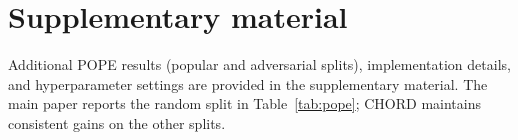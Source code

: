 \section{Supplementary material}

Additional POPE results (popular and adversarial splits), implementation details, and hyperparameter settings are provided in the supplementary material. The main paper reports the random split in Table~\ref{tab:pope}; CHORD maintains consistent gains on the other splits.
